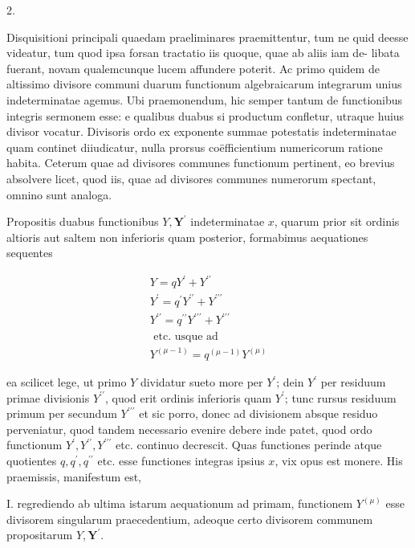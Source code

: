 \documentclass[twoside,12pt, showframe]{memoir}
\begin{document}
2.

Disquisitioni principali quaedam praeliminares praemittentur, tum ne quid deesse videatur, tum quod ipsa forsan tractatio iis quoque, quae ab aliis iam de-
libata fuerant, novam qualemcunque lucem affundere poterit. Ac primo quidem de altissimo divisore communi duarum functionum algebraicarum integrarum unius indeterminatae agemus. Ubi praemonendum, hic semper tantum de functionibus integris sermonem esse: e qualibus duabus si productum confletur, utraque huius divisor vocatur. Divisoris ordo ex exponente summae potestatis indeterminatae quam continet diiudicatur, nulla prorsus coëfficientium numericorum ratione habita. Ceterum quae ad divisores communes functionum pertinent, eo brevius absolvere licet, quod iis, quae ad divisores communes numerorum spectant, omnino sunt analoga.

Propositis duabus functionibus \(Y, \boldsymbol{Y}^{\prime}\) indeterminatae \(x\), quarum prior sit ordinis altioris aut saltem non inferioris quam posterior, formabimus aequationes sequentes

\[
\begin{gathered}
Y=q Y^{\prime}+Y^{\prime \prime} \\
Y^{\prime}=q^{\prime} Y^{\prime \prime}+Y^{\prime \prime \prime} \\
Y^{\prime \prime}=q^{\prime \prime} Y^{\prime \prime \prime}+Y^{\prime \prime \prime} \\
\text { etc. usque ad } \\
Y^{(\mu-1)}=q^{(\mu-1)} Y^{(\mu)}
\end{gathered}
\]

ea scilicet lege, ut primo \(Y\) dividatur sueto more per \(Y^{\prime}\); dein \(Y^{\prime}\) per residuum primae divisionis \(Y^{\prime \prime}\), quod erit ordinis inferioris quam \(Y^{\prime}\); tunc rursus residuum primum per secundum \(Y^{\prime \prime \prime}\) et sic porro, donec ad divisionem absque residuo perveniatur, quod tandem necessario evenire debere inde patet, quod ordo functionum \(Y^{\prime}, Y^{\prime \prime}, Y^{\prime \prime \prime}\) etc. continuo decrescit. Quas functiones perinde atque quotientes \(q, q^{\prime}, q^{\prime \prime}\) etc. esse functiones integras ipsius \(x\), vix opus est monere. His praemissis, manifestum est,

I. regrediendo ab ultima istarum aequationum ad primam, functionem \(Y^{(\mu)}\) esse divisorem singularum praecedentium, adeoque certo divisorem communem propositarum \(Y, \boldsymbol{Y}^{\prime}\).
\end{document}
